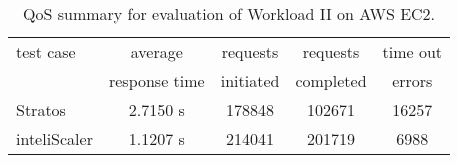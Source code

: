 \begin{table}[h!]
\centering
\caption{QoS summary for evaluation of Workload II on AWS EC2.}
\label{table:analysis_qos_workload_5}
\begin{tabular}{|l|c|c|c|c|}
\hline

test case & average  & requests  & requests  & time out  \\
& response time & initiated & completed & errors \\ \hline

Stratos & 2.7150 s & 178848 & 102671 & 16257\\ \hline

inteliScaler & 1.1207 s & 214041 & 201719 & 6988\\ \hline

\end{tabular}
\end{table}